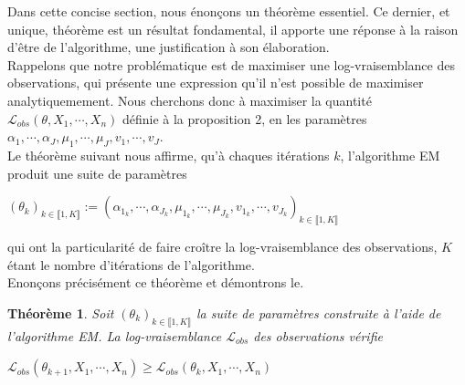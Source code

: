 \documentclass[frenchb]{report}
\newcommand{\1}{\mathbbm{1}}
\newcommand{\lv}{\mathcal{L}}
\newtheorem{thm}{Théorème}
\theoremstyle{definition}\newtheorem{defn}{Définition}
\theoremstyle{definition}\newtheorem{exm}{Exemple}
\theoremstyle{definition}\newtheorem{nota}{Notation}
\theoremstyle{definition}\newtheorem{rem}{Remarque}
\begin{document}
Dans cette concise section, nous énonçons un théorème essentiel. Ce dernier, et unique, théorème est un résultat fondamental, il apporte une réponse à la raison d'être de l'algorithme, une justification à son élaboration. \\
Rappelons que notre problématique est de maximiser une log-vraisemblance des observations, qui présente une expression qu'il n'est possible de maximiser analytiquemement. Nous cherchons donc à maximiser la quantité $\mathcal{L}_{obs}(\theta, X_1, \cdots, X_n)$ définie à la proposition 2, en les paramètres $\alpha_1, \cdots, \alpha_J, \mu_1, \cdots, \mu_J, v_1, \cdots, v_J$. \\
Le théorème suivant nous affirme, qu'à chaques itérations $k$, l'algorithme EM produit une suite de paramètres 
\begin{center}
$(\theta_k)_{k\in \llbracket1, K\rrbracket} := (\alpha_{1_k}, \cdots, \alpha_{J_k}, \mu_{1_k}, \cdots, \mu_{J_k}, v_{1_k}, \cdots, v_{J_k})_{k\in \llbracket1, K\rrbracket}$
\end{center}
qui ont la particularité de faire croître la log-vraisemblance des observations, $K$ étant le nombre d'itérations de l'algorithme. \\ 
Enonçons précisément ce théorème et démontrons le. 

\begin{thm}
Soit $(\theta_k)_{k\in \llbracket1, K\rrbracket}$ la suite de paramètres construite à l'aide de l'algorithme EM. La log-vraisemblance $\lv_{obs}$ des observations vérifie 
\begin{center} $\lv_{obs}(\theta_{k+1}, X_1, \cdots, X_n) \geq \lv_{obs}(\theta_k, X_1, \cdots, X_n)$ \end{center}
\end{thm}
\end{document}
